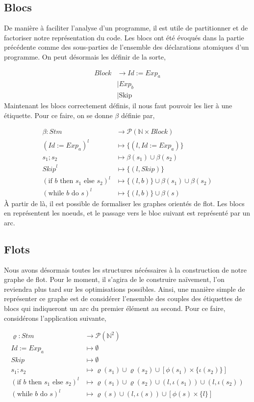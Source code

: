 \documentclass[a4paper, 12pt]{article}
\begin{document}
\subsection{Blocs}
De manière à faciliter l'analyse d'un programme, il est utile de partitionner et de factoriser notre représentation du code. 
Les blocs ont été évoqués dans la partie précédente comme des sous-parties de l'ensemble des déclarations atomiques d'un programme. 
On peut désormais les définir de la sorte,

\begin{align*}
	Block &\rightarrow Id := Exp_a\\
	&\mid Exp_b\\
	&\mid \text{Skip}
\end{align*}
Maintenant les blocs correctement définis, il nous faut pouvoir les lier à une étiquette. Pour ce faire, on se donne $\beta$ définie par,

\begin{align*}
	\beta : Stm &\longrightarrow \mathcal{P}(\mathbb{N} \times Block)\\
	(Id:=Exp_a)^l &\longmapsto \{(l, Id := Exp_a)\}\\
	s_1 ; s_2 &\longmapsto \beta(s_1) \cup \beta(s_2)\\
	\textit{Skip}^l &\longmapsto \{(l, \textit{Skip})\}\\
	(\text{if } b \text{ then }s_1\text{ else }s_2)^l &\longmapsto \{(l, b)\}\cup \beta(s_1)\cup\beta(s_2)\\
	(\text{while }b\text{ do }s)^l &\longmapsto \{(l, b)\}\cup\beta(s)
\end{align*}
À partir de là, il est possible de formaliser les graphes orientés de flot. Les blocs en représentent les noeuds, et le passage 
vers le bloc suivant est représenté par un arc.

\subsection{Flots}
Nous avons désormais toutes les structures nécéssaires à la construction de notre graphe de flot. Pour le moment, il s'agira de 
le construire naïvement, l'on reviendra plus tard sur les optimisations possibles. Ainsi, une manière simple de représenter ce 
graphe est de considérer l'ensemble des couples des étiquettes de blocs qui indiqueront un arc du premier élément au second. 
Pour ce faire, considérons l'application suivante, 

\begin{align*}
	\varrho : Stm &\longrightarrow \mathcal{P}(\mathbb{N}^2) \\
	Id:=Exp_a &\longmapsto \emptyset \\
	\textit{Skip} &\longmapsto \emptyset \\
	s_1 ; s_2 &\longmapsto \varrho(s_1) \cup \varrho(s_2) \cup [\phi(s_1)\times\{\iota(s_2)\}] \\
	(\text{if }b\text{ then }s_1\text{ else }s_2)^l &\longmapsto \varrho(s_1)\cup\varrho(s_2)\cup(l, \iota(s_1))\cup(l, \iota(s_2)) \\
	(\text{while }b\text{ do }s)^l &\longmapsto \varrho(s)\cup(l,\iota(s))\cup[\phi(s)\times\{l\}]
\end{align*}
\end{document}
